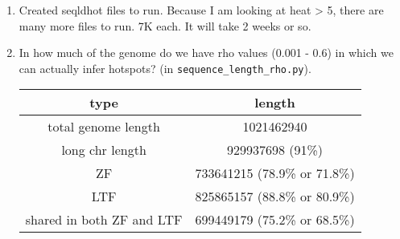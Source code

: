 \documentclass[idxtotoc,hyperref,openany,oneside]{labbook} %
\begin{document}
\begin{enumerate}
\item Created seqldhot files to run. Because I am looking at heat > 5, there are many more files to run. 7K each. It will take 2 weeks or so.
\item In how much of the genome do we have rho values (0.001 - 0.6) in which we can actually infer hotspots? (in \verb+sequence_length_rho.py+).
\begin{table}[h]
\begin{tabular}{cc}
\hline
type & length \\
\hline
total genome length & 1021462940 \\
long chr length & 929937698 (91\%) \\
ZF & 733641215 (78.9\% or 71.8\%) \\
LTF & 825865157 (88.8\% or 80.9\%) \\
shared in both ZF and LTF & 699449179 (75.2\% or 68.5\%) \\
\hline
\end{tabular}
\end{table}
\end{enumerate}
\end{document}
